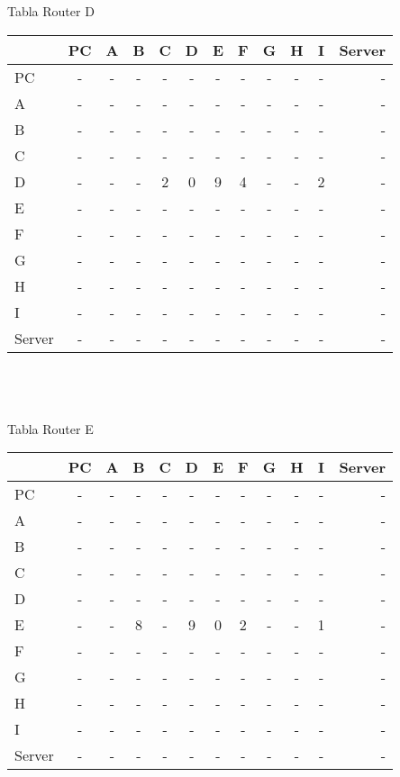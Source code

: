 \documentclass{article}
\begin{document}
\\
\\
Tabla Router D	 \\
\begin{tabular}{l*{10}{c}r}
              & PC & A & B & C & D & E & F & G & H & I & Server \\
\hline
PC             & - & - & - & - & - & - & - & - & - & - & -\\
A              & - & - & - & - & - & - & - & - & - & - & -\\
B              & - & - & - & - & - & - & - & - & - & - & -\\
C              & - & - & - & - & - & - & - & - & - & - & -\\
D              & - & - & - & 2 & 0 & 9 & 4 & - & - & 2 & -\\
E              & - & - & - & - & - & - & - & - & - & - & -\\
F              & - & - & - & - & - & - & - & - & - & - & -\\
G              & - & - & - & - & - & - & - & - & - & - & -\\
H              & - & - & - & - & - & - & - & - & - & - & -\\
I              & - & - & - & - & - & - & - & - & - & - & -\\
Server         & - & - & - & - & - & - & - & - & - & - & -\\

\end{tabular}\\
\\
\\
Tabla Router E \\
\begin{tabular}{l*{10}{c}r}
              & PC & A & B & C & D & E & F & G & H & I & Server \\
\hline
PC             & - & - & - & - & - & - & - & - & - & - & -\\
A              & - & - & - & - & - & - & - & - & - & - & -\\
B              & - & - & - & - & - & - & - & - & - & - & -\\
C              & - & - & - & - & - & - & - & - & - & - & -\\
D              & - & - & - & - & - & - & - & - & - & - & -\\
E              & - & - & 8 & - & 9 & 0 & 2 & - & - & 1 & -\\
F              & - & - & - & - & - & - & - & - & - & - & -\\
G              & - & - & - & - & - & - & - & - & - & - & -\\
H              & - & - & - & - & - & - & - & - & - & - & -\\
I              & - & - & - & - & - & - & - & - & - & - & -\\
Server         & - & - & - & - & - & - & - & - & - & - & -\\

\end{tabular}
\end{document}
